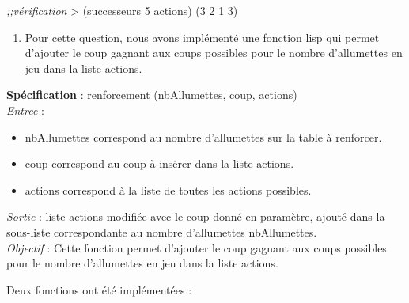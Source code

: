 \documentclass[
]{article}
\newenvironment{Shaded}{}{}
\newcommand{\CommentTok}[1]{\textcolor[rgb]{0.38,0.63,0.69}{\textit{#1}}}
\newcommand{\DecValTok}[1]{\textcolor[rgb]{0.25,0.63,0.44}{#1}}
\newcommand{\NormalTok}[1]{#1}
\newcommand{\OperatorTok}[1]{\textcolor[rgb]{0.40,0.40,0.40}{#1}}
\providecommand{\tightlist}{%
  \setlength{\itemsep}{0pt}\setlength{\parskip}{0pt}}
\begin{document}
\begin{Shaded}
    \begin{algorithm}[H]
    \begin{Highlighting}[]
\CommentTok{;;vérification}
\OperatorTok{\textgreater{}}\NormalTok{ (successeurs }\DecValTok{5}\NormalTok{ actions)}
\NormalTok{(}\DecValTok{3} \DecValTok{2} \DecValTok{1} \DecValTok{3}\NormalTok{)}
\end{Highlighting}
\end{algorithm}
\end{Shaded}


\begin{enumerate}
\def\labelenumi{\arabic{enumi}.}
\setcounter{enumi}{4}
\tightlist
\item
  Pour cette question, nous avons implémenté une fonction lisp qui
  permet d'ajouter le coup gagnant aux coups possibles pour le nombre
  d'allumettes en jeu dans la liste actions.
\end{enumerate}

\textbf{Spécification} : renforcement (nbAllumettes, coup, actions)\\
\emph{Entree} :
\begin{itemize}
\item nbAllumettes correspond au nombre d'allumettes sur la table à
renforcer. 
\item coup correspond au coup à insérer dans la liste actions. 
\item actions correspond à la liste de toutes les actions possibles.
\end{itemize}

\emph{Sortie} : liste actions modifiée avec le coup donné en paramètre,
ajouté dans la sous-liste correspondante au nombre d'allumettes
nbAllumettes.\\
\emph{Objectif} : Cette fonction permet d'ajouter le coup gagnant aux
coups possibles pour le nombre d'allumettes en jeu dans la liste
actions.

\pagebreak
Deux fonctions ont été implémentées :
\end{document}
